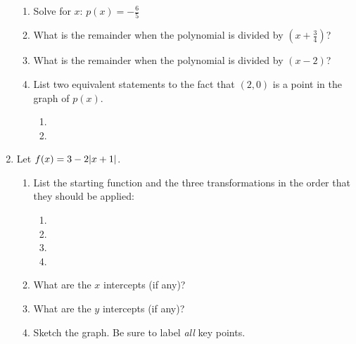\documentclass[letterpaper,12pt,fleqn]{article}
\begin{document}
\begin{enumerate}
  \begin{enumerate}
  \item Solve for $x$: $p(x)=-\frac{6}{5}$

    \vspace{1in}
    
  \item What is the remainder when the polynomial is divided by
    $\left(x+\frac{3}{4}\right)$?

    \vspace{1in}
    
  \item What is the remainder when the polynomial is divided by $(x-2)$?

    \vspace{1in}
    
  \item List two equivalent statements to the fact that $(2,0)$ is a point
    in the graph of $p(x)$.
    \begin{enumerate}
    \item
    \item
    \end{enumerate}
  \end{enumerate}

  \newpage

\item Let $f(x)=3-2\lvert x+1\rvert$.
  \begin{enumerate}
  \item List the starting function and the three transformations in the order
    that they should be applied:
    \begin{enumerate}
      \item
      \item
      \item
      \item
    \end{enumerate}
  \item What are the $x$ intercepts (if any)?

    \vspace{2in}
    
  \item What are the $y$ intercepts (if any)?

    \vspace{1in}
    
  \item Sketch the graph. Be sure to label \emph{all} key points.

    \bigskip


\end{enumerate}
\end{enumerate}
\end{document}
